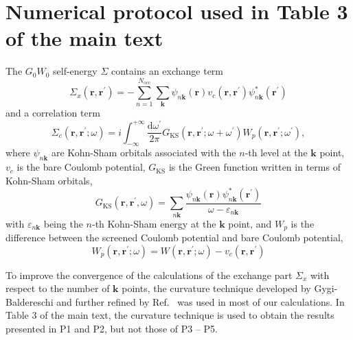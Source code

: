 \documentclass[journal=jctc,manuscript=article,preprint]{achemso}
\newcommand{\bfk}{{\mathbf{k}}}
\newcommand{\bfr}{{\mathbf{r}}}
\begin{document}
\clearpage

\section{ Numerical protocol used in Table 3 of the main text}
The $G_0W_0$ self-energy $\Sigma$ contains an exchange term 
\begin{equation}
    \Sigma_x(\bfr,\bfr^\prime) = -\sum_{n=1}^{N_\mathrm{occ}}\sum_{\bfk}\psi_{n\bfk}(\bfr)v_c(\bfr,\bfr^\prime)\psi_{n\bfk}^*(\bfr^\prime)
\end{equation}
and a correlation term
\begin{equation}
    \Sigma_c(\bfr,\bfr^\prime;\omega) = i\int_{-\infty}^{+\infty}\frac{\mathrm{d}\omega^\prime}{2\pi}G_\mathrm{KS}(\bfr,\bfr^\prime;\omega+\omega^\prime)W_p(\bfr,\bfr^\prime;\omega^\prime),
\end{equation}  
where $\psi_{n\bfk}$ are Kohn-Sham orbitals associated with the $n$-th level at the $\bfk$ point, $v_c$ is the bare Coulomb potential, $G_\mathrm{KS}$ is the Green function written in terms of Kohn-Sham orbitals,
\begin{equation}
    G_\mathrm{KS}(\bfr,\bfr^\prime,\omega) = \sum_{n\bfk}\frac{\psi_{n\bfk}(\bfr)\psi^*_{n\bfk}(\bfr^\prime)}{\omega-\varepsilon_{n\bfk}}
\end{equation}
with $\varepsilon_{n\bfk}$ being the $n$-th Kohn-Sham energy at the $\bfk$ point, and $W_p$ is the difference between the screened Coulomb potential and bare Coulomb potential,
\begin{equation}
    W_p(\bfr,\bfr^\prime;\omega) = W(\bfr,\bfr^\prime;\omega) - v_c(\bfr,\bfr^\prime)
\end{equation}

To improve the convergence of the calculations of the exchange part $\Sigma_x$ with respect to the number of $\bfk$ points, the curvature technique developed by  Gygi-Baldereschi\cite{Gygi1986} and further refined by   Ref.~ was used in most of our calculations. In Table 3 of the main text, the curvature technique is used to obtain the results presented in P1 and P2, but not those of P3 -- P5.
\end{document}
